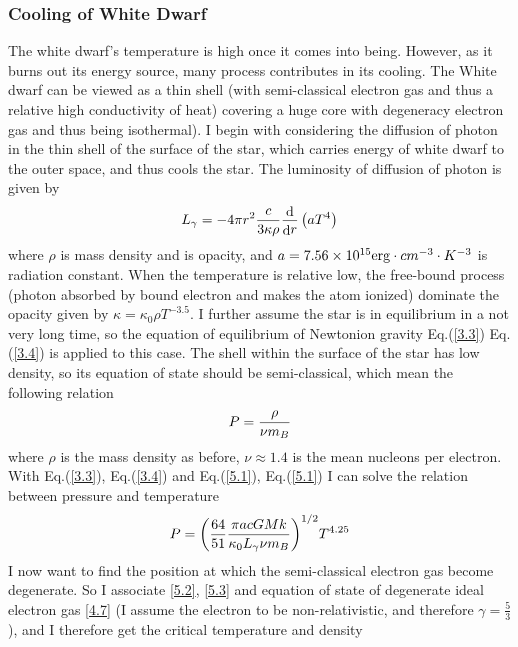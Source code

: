 \documentclass[reprint]{revtex4-1}
\begin{document}
\subsubsection{Cooling of White Dwarf}
The white dwarf’s temperature is high once it comes into being. However, as it burns out its energy source, many process contributes in its cooling. The White dwarf can be viewed as a thin shell (with semi-classical electron gas and thus a relative high conductivity of heat) covering a huge core with degeneracy electron gas and thus being isothermal). I begin with considering the diffusion of photon in the thin shell of the surface of the star, which carries energy of white dwarf to the outer space, and thus cools the star. The luminosity of diffusion of photon is given by 
\begin{equation}
{L_\gamma } =  - 4\pi {r^2}{c \over {3\kappa \rho }}{{\mathop{\rm d}\nolimits}  \over {{\mathop{\rm d}\nolimits} r}}\left( {a{T^4}} \right) \label{5.1}
\end{equation}
where $\rho$ is mass density and is opacity, and $a = 7.56 \times {10^{15}}{\rm{   }}{\mathop{\rm erg}\nolimits}  \cdot c{m^{ - 3}} \cdot {K^{ - 3}}$ is radiation constant. When the temperature is relative low, the free-bound process (photon absorbed by bound electron and makes the atom ionized) dominate the opacity given by $\kappa  = {\kappa _0}\rho {T^{ - 3.5}}$. I further assume the star is in equilibrium in a not very long time, so the equation of equilibrium of Newtonion gravity Eq.(\ref{3.3}) Eq.(\ref{3.4}) is applied to this case. The shell within the surface of the star has low density, so its equation of state should be semi-classical, which mean the following relation
\begin{equation}
P = {\rho  \over {\nu {m_B}}} \label{5.2}
\end{equation}
where $\rho$ is the mass density as before, $\nu\approx1.4$ is the mean nucleons per electron. With Eq.(\ref{3.3}), Eq.(\ref{3.4}) and Eq.(\ref{5.1}), Eq.(\ref{5.1}) I can solve the relation between pressure and temperature
\begin{equation}
P = {\left( {{{64} \over {51}}{{\pi acGMk} \over {{\kappa _0}{L_\gamma }\nu {m_B}}}} \right)^{1/2}}{T^{4.25}} \label{5.3}
\end{equation}
I now want to find the position at which the semi-classical electron gas become degenerate. So I associate \ref{5.2}, \ref{5.3} and equation of state of degenerate ideal electron gas \ref{4.7} (I assume the electron to be non-relativistic, and therefore $\gamma=\frac{5}{3}$), and I therefore get the critical temperature and density
\end{document}
